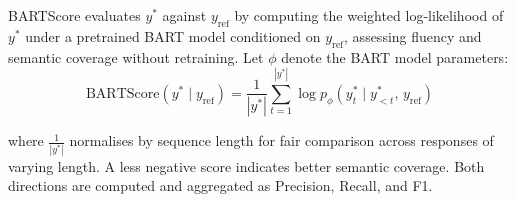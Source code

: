\documentclass[conference,a4paper]{IEEEtran}
\begin{document}
%

BARTScore \cite{yuan2021bartscore} evaluates $y^*$
against $y_{\text{ref}}$ by computing the weighted
log-likelihood of $y^*$ under a pretrained BART
model conditioned on $y_{\text{ref}}$, assessing
fluency and semantic coverage without retraining.
Let $\phi$ denote the BART model parameters:
\begin{equation}\label{eq:bartscore}
    \text{BARTScore}(y^* \mid y_{\text{ref}}) = 
    \frac{1}{|y^*|}\sum_{t=1}^{|y^*|} \log p_\phi
    \!\left(y^*_t \mid y^*_{<t},\, 
    y_{\text{ref}}\right)
\end{equation}


\noindent where $\frac{1}{|y^*|}$ normalises by
sequence length for fair comparison across
responses of varying length. A less negative
score indicates better semantic coverage.
Both directions are computed and aggregated
as Precision, Recall, and F1.
\end{document}
